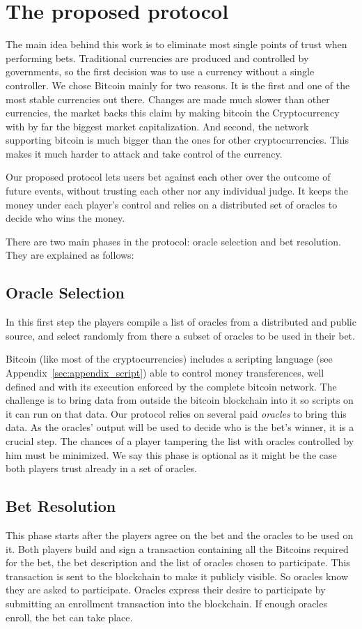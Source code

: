 \section{The proposed protocol}

The main idea behind this work is to eliminate most single points of
  trust when performing bets.
Traditional currencies are produced and controlled by governments, so the first
  decision was to use a currency without a single controller.
We chose Bitcoin mainly for two reasons.
It is the first and one of the most stable currencies out there.
Changes are made much slower than other currencies, the market backs this claim
  by making bitcoin the Cryptocurrency with by far the biggest market
  capitalization.
And second, the network supporting bitcoin is much bigger than the ones for
  other cryptocurrencies. This makes it much harder to attack and take control
  of the currency.

Our proposed protocol lets users bet against each other over the outcome of
  future events, without trusting each other nor any individual judge.
It keeps the money under each player's control and relies on a distributed set
  of oracles to decide who wins the money.

There are two main phases in the protocol: oracle selection and bet
  resolution. They are explained as follows:

\subsection{Oracle Selection}
In this first step the players compile a list of oracles from a distributed
  and public source, and select randomly from there a subset of oracles to
  be used in their bet.

Bitcoin (like most of the cryptocurrencies) includes a scripting language
  (see Appendix~\ref{sec:appendix_script})
able
 to control money transferences, well defined and with its execution enforced by
 the complete bitcoin network.
The challenge is to bring data from outside the bitcoin blockchain into it so
  scripts on it can run on that data.
Our protocol relies on several paid \textit{oracles} to bring this data.
As the oracles' output will be used to decide who is the bet's winner, it is a
  crucial step.
The chances of a player tampering the list with oracles controlled by him must
  be minimized.
We say this phase is optional as it might be the case both players trust already
  in a set of oracles.

\subsection{Bet Resolution}
This phase starts after the players agree on the bet and the oracles to be used
  on it.
Both players build and sign a transaction containing all the Bitcoins required
  for the bet, the bet description and the list of oracles chosen to
  participate.
This transaction is sent to the blockchain to make it publicly visible. So
  oracles know they are asked to participate.
Oracles express their desire to participate by submitting an enrollment
  transaction into the blockchain.
If enough oracles enroll, the bet can take place.

